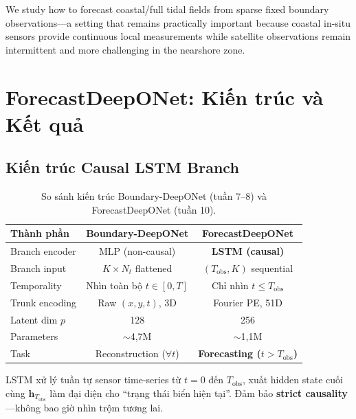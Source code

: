 \documentclass[12pt,a4paper]{article}
\begin{document}
\begin{tcolorbox}[colback=green!5, colframe=green!50!black, title={Positioning Statement}]
We study how to forecast coastal/full tidal fields from sparse fixed boundary observations---a setting that remains practically important because coastal in-situ sensors provide continuous local measurements while satellite observations remain intermittent and more challenging in the nearshore zone.
\end{tcolorbox}

\section{ForecastDeepONet: Kiến trúc và Kết quả}

\subsection{Kiến trúc Causal LSTM Branch}

\begin{table}[ht]
  \centering
  \caption{So sánh kiến trúc Boundary-DeepONet (tuần 7--8) và ForecastDeepONet (tuần 10).}
  \label{tab:arch_compare}
  \begin{tabular}{@{}lcc@{}}
    \toprule
    \textbf{Thành phần} & \textbf{Boundary-DeepONet} & \textbf{ForecastDeepONet} \\
    \midrule
    Branch encoder & MLP (non-causal) & \textbf{LSTM (causal)} \\
    Branch input & $K \times N_t$ flattened & $(T_\mathrm{obs}, K)$ sequential \\
    Temporality & Nhìn toàn bộ $t \in [0,T]$ & Chỉ nhìn $t \leq T_\mathrm{obs}$ \\
    Trunk encoding & Raw $(x,y,t)$, 3D & Fourier PE, 51D \\
    Latent dim $p$ & 128 & 256 \\
    Parameters & $\sim$4,7M & $\sim$1,1M \\
    \midrule
    Task & Reconstruction ($\forall t$) & \textbf{Forecasting ($t > T_\mathrm{obs}$)} \\
    \bottomrule
  \end{tabular}
\end{table}

LSTM xử lý tuần tự sensor time-series từ $t=0$ đến $T_\mathrm{obs}$, xuất hidden state cuối cùng $\mathbf{h}_{T_\mathrm{obs}}$ làm đại diện cho ``trạng thái biển hiện tại''. Đảm bảo \textbf{strict causality}---không bao giờ nhìn trộm tương lai.
\end{document}
